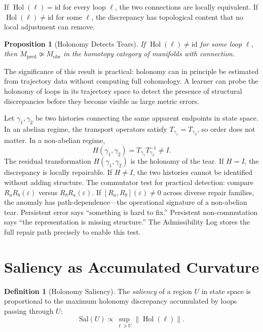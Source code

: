 \documentclass[12pt,oneside]{book}
\theoremstyle{plain}
\newtheorem{proposition}[theorem]{Proposition}
\theoremstyle{definition}
\newtheorem{definition}[theorem]{Definition}
\theoremstyle{remark}
\DeclareMathOperator{\Hol}{Hol}
\newcommand{\eps}{\varepsilon}
\newcommand{\norm}[1]{\left\lVert #1 \right\rVert}
\newcommand{\1}{\mathbf{1}}
\begin{document}
If $\Hol(\ell) = \mathrm{id}$ for every loop $\ell$, the two connections are locally equivalent. If $\Hol(\ell) \neq \mathrm{id}$ for some $\ell$, the discrepancy has topological content that no local adjustment can remove.

\begin{proposition}[Holonomy Detects Tears]
\label{prop:holonomy-tears}
If $\Hol(\ell) \neq \mathrm{id}$ for some loop $\ell$, then $M_{\mathrm{pred}} \not\simeq M_{\mathrm{obs}}$ in the homotopy category of manifolds with connection.
\end{proposition}

The significance of this result is practical: holonomy can in principle be estimated from trajectory data without computing full cohomology. A learner can probe the holonomy of loops in its trajectory space to detect the presence of structural discrepancies before they become visible as large metric errors.

\begin{derivbox}[frametitle={Derivation 5: Non-Abelian Tears as Holonomy}]
Let $\gamma_1, \gamma_2$ be two histories connecting the same apparent endpoints in state space. In an abelian regime, the transport operators satisfy $T_{\gamma_1} = T_{\gamma_2}$, so order does not matter. In a non-abelian regime,
\[
H(\gamma_1, \gamma_2) = T_{\gamma_1} T_{\gamma_2}^{-1} \neq I.
\]
The residual transformation $H(\gamma_1, \gamma_2)$ is the holonomy of the tear. If $H = I$, the discrepancy is locally repairable. If $H \neq I$, the two histories cannot be identified without adding structure. The commutator test for practical detection: compare $R_a R_b(\eps)$ versus $R_b R_a(\eps)$. If $[R_a, R_b](\eps) \neq 0$ across diverse repair families, the anomaly has path-dependence---the operational signature of a non-abelian tear. Persistent error says ``something is hard to fix.'' Persistent non-commutation says ``the representation is missing structure.'' The Admissibility Log stores the full repair path precisely to enable this test.
\end{derivbox}

\section{Saliency as Accumulated Curvature}

\begin{definition}[Holonomy Saliency]
The \emph{saliency} of a region $U$ in state space is proportional to the maximum holonomy discrepancy accumulated by loops passing through $U$:
\[
\mathrm{Sal}(U) \propto \sup_{\ell \ni U} \norm{\Hol(\ell)}.
\]
\end{definition}
\end{document}

